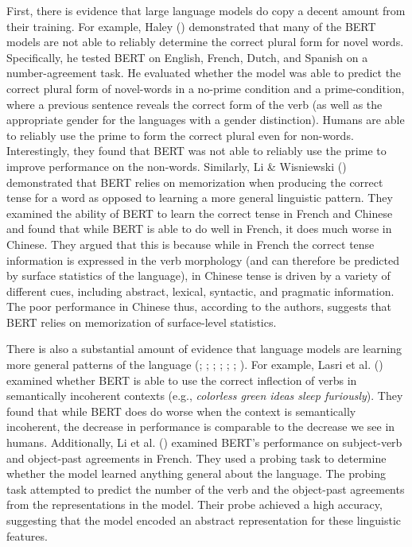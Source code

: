 \documentclass[
  12pt,
  letterpaper,
]{scrreprt}
\begin{document}
First, there is evidence that large language models do copy a decent
amount from their training. For example, Haley
() demonstrated that many of
the BERT models are not able to reliably determine the correct plural
form for novel words. Specifically, he tested BERT on English, French,
Dutch, and Spanish on a number-agreement task. He evaluated whether the
model was able to predict the correct plural form of novel-words in a
no-prime condition and a prime-condition, where a previous sentence
reveals the correct form of the verb (as well as the appropriate gender
for the languages with a gender distinction). Humans are able to
reliably use the prime to form the correct plural even for non-words.
Interestingly, they found that BERT was not able to reliably use the
prime to improve performance on the non-words. Similarly, Li \&
Wisniewski () demonstrated
that BERT relies on memorization when producing the correct tense for a
word as opposed to learning a more general linguistic pattern. They
examined the ability of BERT to learn the correct tense in French and
Chinese and found that while BERT is able to do well in French, it does
much worse in Chinese. They argued that this is because while in French
the correct tense information is expressed in the verb morphology (and
can therefore be predicted by surface statistics of the language), in
Chinese tense is driven by a variety of different cues, including
abstract, lexical, syntactic, and pragmatic information. The poor
performance in Chinese thus, according to the authors, suggests that
BERT relies on memorization of surface-level statistics.

There is also a substantial amount of evidence that language models are
learning more general patterns of the language
(;
;
;
;
;
; ). For example, Lasri et al.
() examined whether
BERT is able to use the correct inflection of verbs in semantically
incoherent contexts (e.g., \emph{colorless green ideas sleep
furiously}). They found that while BERT does do worse when the context
is semantically incoherent, the decrease in performance is comparable to
the decrease we see in humans. Additionally, Li et al.
() examined
BERT's performance on subject-verb and object-past agreements in French.
They used a probing task to determine whether the model learned anything
general about the language. The probing task attempted to predict the
number of the verb and the object-past agreements from the
representations in the model. Their probe achieved a high accuracy,
suggesting that the model encoded an abstract representation for these
linguistic features.
\end{document}
